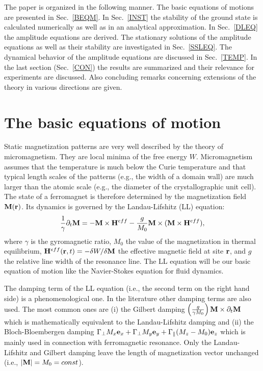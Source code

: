 The paper is organized in the following manner. The basic equations
of motions are presented in Sec.~\ref{BEQM}. In Sec.~\ref{INST} the
stability of the ground state is calculated numerically as well as in
an analytical approximation. In Sec.~\ref{DLEQ} the amplitude
equations are derived. The stationary solutions of the amplitude
equations as well as their stability are investigated in
Sec.~\ref{SSLEQ}. The dynamical behavior of the amplitude equations
are discussed in Sec.~\ref{TEMP}. In the last section
(Sec.~\ref{CON}) the results are summarized and their relevance for
experiments are discussed. Also concluding remarks concerning
extensions of the theory in various directions are given.


\section{\protect\label{BEQM}The basic equations of motion}

Static magnetization patterns are very well described by the theory
of micromagnetism\cite{bro.63}. They are local minima of the free
energy $W$.  Micromagnetism assumes that the temperature is much
below the Curie temperature and that typical length scales of the
patterns (e.g., the width of a domain wall) are much larger than the
atomic scale (e.g.,  the diameter of the crystallographic unit cell).
The state of a ferromagnet is therefore determined by the
magnetization field ${\bf M}({\bf r})$. Its dynamics is governed by
the Landau-Lifshitz (LL) equation:
\begin{equation}
  \frac{1}{\gamma}\partial_t{\bf M} = -{\bf M}\times{\bf H}^{eff}
   -\frac{g}{M_0}{\bf M}\times({\bf M}\times{\bf H}^{eff}),
  \label{LLeq}
\end{equation}
where $\gamma$ is the gyromagnetic ratio, $M_0$ the value of the
magnetization in thermal equilibrium, ${\bf H}^{eff}({\bf
r},t)=-\delta W/\delta{\bf M}$ the effective magnetic field at site
${\bf r}$, and $g$ the relative line width of the resonance line. The
LL equation will be our basic equation of motion like the
Navier-Stokes equation for fluid dynamics.

The damping term of the LL equation (i.e., the second term on the
right hand side) is a phenomenological one. In the literature other
damping terms are also used. The most common ones are (i) the Gilbert
damping $\left(\frac{g}{\gamma M_0}\right){\bf M}\times
\partial_t{\bf M}$ which is mathematically equivalent to the
Landau-Lifshitz damping and (ii) the Bloch-Bloembergen damping
$\Gamma_\bot M_x{\bf e}_x+\Gamma_\bot M_y{\bf e}_y+\Gamma_\|(M_z-M_0)
{\bf e}_z$ which is mainly used in connection with ferromagnetic
resonance. Only the Landau-Lifshitz and Gilbert damping leave the
length of magnetization vector unchanged (i.e., $|{\bf
M}|=M_0=const$).

